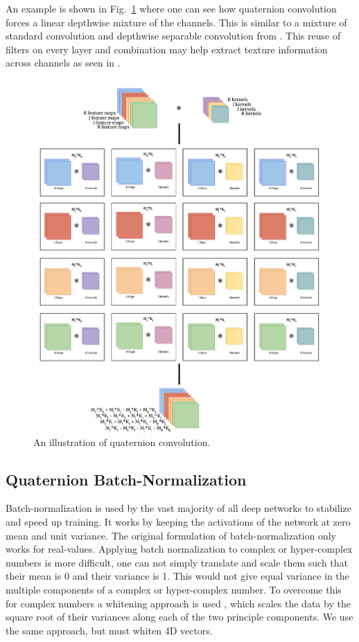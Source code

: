\documentclass[conference]{IEEEtran}
\begin{document}
An example is shown in Fig.~\ref{f:quatconv} where one can see how quaternion convolution forces a linear depthwise mixture of the channels. This is similar to a mixture of standard convolution and depthwise separable convolution from \cite{chollet2016xception}. This reuse of filters on every layer and combination may help extract texture information across channels as seen in \cite{shi2007quaternion}.

\begin{figure}
	\centering
		\includegraphics[width=1.0\textwidth]{quatconv.png}
	\caption{An illustration of quaternion convolution.}
	\label{f:quatconv}
\end{figure}


\subsection{Quaternion Batch-Normalization}
Batch-normalization \cite{ioffe2015batch} is used by the vast majority of all deep networks to stabilize and speed up training.
It works by keeping the activations of the network at zero mean and unit variance.
The original formulation of batch-normalization only works for real-values. 
Applying batch normalization to complex or hyper-complex numbers is more difficult, one can not simply translate and scale them such that their mean is 0 and their variance is 1.
This would not give equal variance in the multiple components of a complex or hyper-complex number.
To overcome this for complex numbers a whitening approach is used \cite{trabelsi2017deep}, which scales the data by the square root of their variances along each of the two principle components.
We use the same approach, but must whiten 4D vectors.
\end{document}
